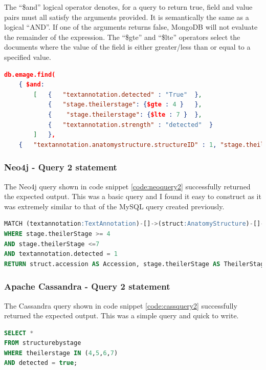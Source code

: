 The ``\$and'' logical operator denotes, for a query to return true, field and value pairs must all satisfy the arguments provided. It is semantically the same as a logical ``AND''. If one of the arguments returns false, MongoDB will not evaluate the remainder of the expression. The ``\$gte'' and ``\$lte'' operators select the documents where the value of the field is either greater/less than or equal to a specified value.

\begin{lstlisting}[language=json, caption=MongoDB query 2 statement. All structures between Theiler Stage X and Y., label=code:mongoquery2]
db.emage.find(
	{ $and:
		[	{	"textannotation.detected" : "True"	},
			{	"stage.theilerstage": {$gte : 4 }	},
			{	 "stage.theilerstage": {$lte : 7 }	},
			{	"textannotation.strength" : "detected"	}
		]	},
	{	"textannotation.anatomystructure.structureID" : 1, "stage.theilerstage" : 1, "_id" : 0	}	).pretty();
\end{lstlisting}

\subsubsection*{Neo4j - Query 2 statement}\label{neoquery2statement}
The Neo4j query shown in code snippet \ref{code:neoquery2} successfully returned the expected output. This was a basic query and I found it easy to construct as it was extremely similar to that of the MySQL query created previously.

\begin{lstlisting}[language=SQL, caption=Neo4j query 2 statement. All structures between Theiler Stage X and Y., label=code:neoquery2]
MATCH (textannotation:TextAnnotation)-[]->(struct:AnatomyStructure)-[]->(stage:Stage)
WHERE stage.theilerStage >= 4
AND stage.theilerStage <=7
AND textannotation.detected = 1
RETURN struct.accession AS Accession, stage.theilerStage AS TheilerStage;
\end{lstlisting}

\subsubsection*{Apache Cassandra - Query 2 statement}\label{cassquery2statement}
The Cassandra query shown in code snippet \ref{code:cassquery2} successfully returned the expected output. This was a simple query and quick to write.

\begin{lstlisting}[language=SQL, caption=Cassandra query 2 statement. All structures between Theiler Stage X and Y., label=code:cassquery2]
SELECT *
FROM structurebystage
WHERE theilerstage IN (4,5,6,7)
AND detected = true;
\end{lstlisting}

